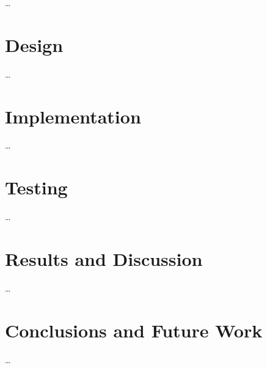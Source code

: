 \documentclass[11pt,openright,a4paper]{report}
\begin{document}
\ldots


\chapter{Design}

\ldots


\chapter{Implementation}

\ldots


\chapter{Testing}

\ldots


\chapter{Results and Discussion}

\ldots


\chapter{Conclusions and Future Work}

\ldots

\printbibliography
\end{document}
